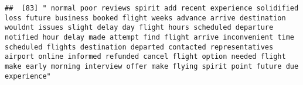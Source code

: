 \documentclass[
]{article}
\begin{document}
\begin{verbatim}
##  [83] " normal poor reviews spirit add recent experience solidified loss future business booked flight weeks advance arrive destination wouldnt issues slight delay day flight hours scheduled departure notified hour delay made attempt find flight arrive inconvenient time scheduled flights destination departed contacted representatives airport online informed refunded cancel flight option needed flight make early morning interview offer make flying spirit point future due experience"                                                                                                                                                                                                                                                                                                                                                                                                                                                                                                                                                                                                                                                                                                                                                                                                                                                                                                                                                                                                                                                                                                                                                                                                                                                                                                

\end{verbatim}
\end{document}
